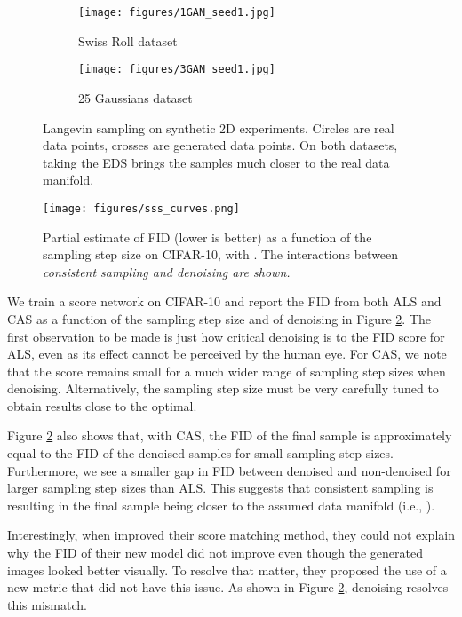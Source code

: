 \documentclass{article} \usepackage{iclr2021_conference_notitle,times}
\theoremstyle{definition}
\theoremstyle{definition}
\begin{document}
\begin{figure}[ht] 
  \begin{subfigure}[b]{0.5\linewidth}
    \centering
    \texttt{[image: figures/1GAN\_seed1.jpg]} 
    \vspace{-0.5cm}
    \caption{Swiss Roll dataset} 
  \end{subfigure}
  \begin{subfigure}[b]{0.5\linewidth}
    \centering
    \texttt{[image: figures/3GAN\_seed1.jpg]}
    \vspace{-0.5cm}
    \caption{25 Gaussians dataset} 
  \end{subfigure}
  \caption{Langevin sampling on synthetic 2D experiments. Circles are real data points, crosses are generated data points. On both datasets, taking the EDS brings the samples much closer to the real data manifold.}
  \label{fig1} 
\end{figure}

\begin{figure}[h] 
    \centering
    \texttt{[image: figures/sss\_curves.png]} 
  
\caption{Partial estimate of FID (lower is better) as a function of the sampling step size on CIFAR-10, with . The interactions between \em consistent sampling \em and denoising are shown.
  }
  \label{lr_rate_cifar10} 
\end{figure}


We train a score network on CIFAR-10 \citep{krizhevsky2009learning} and report the FID from both ALS and CAS as a function of the sampling step size and of denoising in Figure \ref{lr_rate_cifar10}. The first observation to be made is just how critical denoising is to the FID score for ALS, even as its effect cannot be perceived by the human eye. For CAS, we note that the score remains small for a much wider range of sampling step sizes when denoising. Alternatively, the sampling step size must be very carefully tuned to obtain results close to the optimal. 


Figure \ref{lr_rate_cifar10} also shows that, with CAS, the FID of the final sample is approximately equal to the FID of the denoised samples for small sampling step sizes. Furthermore, we see a smaller gap in FID between denoised and non-denoised for larger sampling step sizes than ALS. This suggests that consistent sampling is resulting in the final sample being closer to the assumed data manifold (i.e., ).

Interestingly, when \citet{song2020improved} improved their score matching method, they could not explain why the FID of their new model did not improve even though the generated images looked better visually. To resolve that matter, they proposed the use of a new metric \citep{zhou2019hype} that did not have this issue. As shown in Figure \ref{lr_rate_cifar10}, denoising resolves this mismatch.
\end{document}
